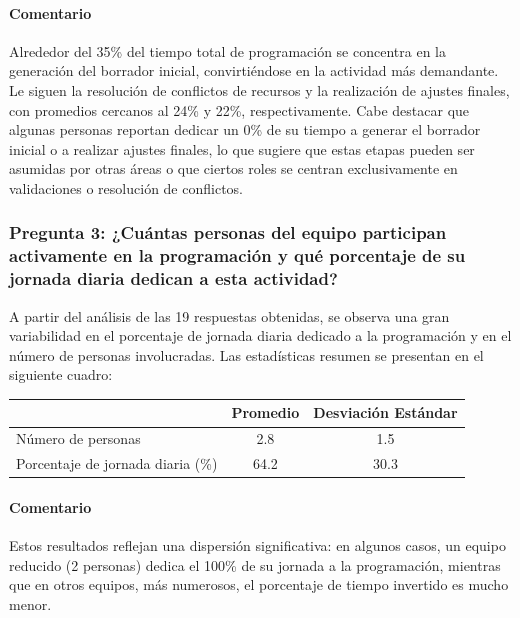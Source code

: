 \documentclass{article}
\begin{document}
\begin{appendix}
    \paragraph{Comentario} Alrededor del 35\% del tiempo total de programación se concentra en la generación del borrador inicial, convirtiéndose en la actividad más demandante. Le siguen la resolución de conflictos de recursos y la realización de ajustes finales, con promedios cercanos al 24\% y 22\%, respectivamente. Cabe destacar que algunas personas reportan dedicar un 0\% de su tiempo a generar el borrador inicial o a realizar ajustes finales, lo que sugiere que estas etapas pueden ser asumidas por otras áreas o que ciertos roles se centran exclusivamente en validaciones o resolución de conflictos.
    
    \vspace{1.5em}
    \subsubsection*{Pregunta 3: ¿Cuántas personas del equipo participan activamente en la programación y qué porcentaje de su jornada diaria dedican a esta actividad?}
    
    A partir del análisis de las 19 respuestas obtenidas, se observa una gran variabilidad en el porcentaje de jornada diaria dedicado a la programación y en el número de personas involucradas. Las estadísticas resumen se presentan en el siguiente cuadro:
    
    \begin{table}[htbp]
        \centering
        \begin{tabular}{lcc}
            \toprule
            & \textbf{Promedio} & \textbf{Desviación Estándar} \\
            \midrule
            Número de personas & 2.8 & 1.5 \\
            Porcentaje de jornada diaria (\%) & 64.2 & 30.3 \\
            \bottomrule
        \end{tabular}
        \label{tab:estadisticas_resumen_jornada}
    \end{table}
    
    \paragraph{Comentario} Estos resultados reflejan una dispersión significativa: en algunos casos, un equipo reducido (2 personas) dedica el 100\% de su jornada a la programación, mientras que en otros equipos, más numerosos, el porcentaje de tiempo invertido es mucho menor.
    

\end{appendix}
\end{document}
